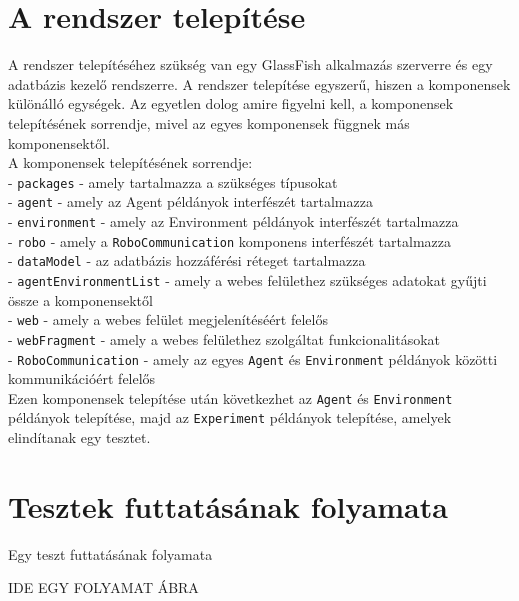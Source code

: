 \section{A rendszer telepítése}\label{sec:Telepites}
A rendszer telepítéséhez szükség van egy GlassFish alkalmazás szerverre és egy adatbázis kezelő rendszerre. A rendszer telepítése egyszerű, hiszen a komponensek különálló egységek. Az egyetlen dolog amire figyelni kell, a komponensek telepítésének sorrendje, mivel az egyes komponensek függnek más komponensektől.
\\
A komponensek telepítésének sorrendje:
\\
- \texttt{packages} - amely tartalmazza a szükséges típusokat
\\
- \texttt{agent} - amely az Agent példányok interfészét tartalmazza
\\
- \texttt{environment} - amely az Environment példányok interfészét tartalmazza
\\
- \texttt{robo} - amely a \texttt{RoboCommunication} komponens interfészét tartalmazza
\\
- \texttt{dataModel} - az adatbázis hozzáférési réteget tartalmazza
\\
- \texttt{agentEnvironmentList} - amely a webes felülethez szükséges adatokat gyűjti össze a komponensektől
\\
- \texttt{web} - amely a webes felület megjelenítéséért felelős
\\
- \texttt{webFragment} - amely a webes felülethez szolgáltat funkcionalitásokat
\\
- \texttt{RoboCommunication} - amely az egyes \texttt{Agent} és \texttt{Environment} példányok közötti kommunikációért felelős
\\
Ezen komponensek telepítése után következhet az \texttt{Agent} és \texttt{Environment} példányok telepítése, majd az \texttt{Experiment} példányok telepítése, amelyek elindítanak egy tesztet.

\section{Tesztek futtatásának folyamata}\label{sec:TesztekFolyamata}
Egy teszt futtatásának folyamata


IDE EGY FOLYAMAT ÁBRA




